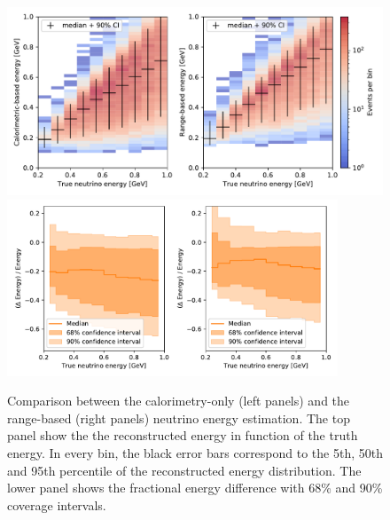 \begin{figure}[H]
  \begin{minipage}[c]{0.5\textwidth}
    \includegraphics[width=\textwidth]{NuMuCCsel/Images/run3/resolution.pdf}
    \includegraphics[width=0.88\textwidth]{NuMuCCsel/Images/run3/resolution_errors.pdf}
  \end{minipage}\hfill
  \begin{minipage}[c]{0.5\textwidth}
    \caption{
Comparison between the calorimetry-only (left panels) and the range-based (right panels) neutrino energy estimation. The top panel show the the reconstructed energy in function of the truth energy. In every bin, the black error bars correspond to the 5th, 50th and 95th percentile of the reconstructed energy distribution. The lower panel shows the fractional energy difference with 68\% and 90\% coverage intervals. 
    } 
    \label{fig:numu:reso_e}
  \end{minipage}
\end{figure}

